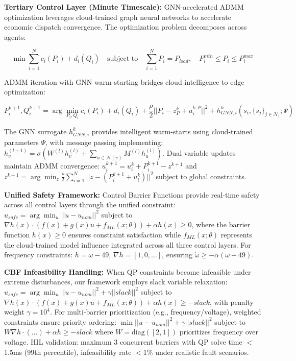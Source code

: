 \documentclass[12pt]{article}
\begin{document}
\textbf{Tertiary Control Layer (Minute Timescale):} GNN-accelerated ADMM optimization leverages cloud-trained graph neural networks to accelerate economic dispatch convergence. The optimization problem decomposes across agents:

$$\min \sum_{i=1}^N c_i(P_i) + d_i(Q_i) \quad \text{subject to} \quad \sum_{i=1}^N P_i = P_{load}, \quad P_i^{min} \leq P_i \leq P_i^{max}$$

ADMM iteration with GNN warm-starting bridges cloud intelligence to edge optimization:

$$P_i^{k+1}, Q_i^{k+1} = \arg\min_{P_i,Q_i} c_i(P_i) + d_i(Q_i) + \frac{\rho}{2}||P_i - z_P^k + u_i^{k,P}||^2 + h_{GNN,i}^k(s_i, \{s_j\}_{j \in \mathcal{N}_i}; \Psi)$$

The GNN surrogate $h_{GNN,i}^k$ provides intelligent warm-starts using cloud-trained parameters $\Psi$, with message passing implementing: $h_v^{(l+1)} = \sigma\left(W^{(l)} h_v^{(l)} + \sum_{u \in \mathcal{N}(v)} M^{(l)} h_u^{(l)}\right)$. Dual variable updates maintain ADMM convergence: $u_i^{k+1} = u_i^k + P_i^{k+1} - z^{k+1}$ and $z^{k+1} = \arg\min_z \frac{\rho}{2}\sum_{i=1}^N ||z - (P_i^{k+1} + u_i^k)||^2$ subject to global constraints.

\textbf{Unified Safety Framework:} Control Barrier Functions \cite{ames2017} provide real-time safety across all control layers through the unified constraint: $u_{safe} = \arg\min_u ||u - u_{nom}||^2$ subject to $\nabla h(x) \cdot (f(x) + g(x)u + f_{ML}(x; \theta)) + \alpha h(x) \geq 0$, where the barrier function $h(x) \geq 0$ ensures constraint satisfaction while $f_{ML}(x; \theta)$ represents the cloud-trained model influence integrated across all three control layers. For frequency constraints: $h = \omega - 49$, $\nabla h = [1,0,\ldots]$, ensuring $\dot{\omega} \geq -\alpha(\omega - 49)$.

\textbf{CBF Infeasibility Handling:} When QP constraints become infeasible under extreme disturbances, our framework employs slack variable relaxation: $u_{safe} = \arg\min_u ||u - u_{nom}||^2 + \gamma||slack||^2$ subject to $\nabla h(x) \cdot (f(x) + g(x)u + f_{ML}(x; \theta)) + \alpha h(x) \geq -slack$, with penalty weight $\gamma = 10^4$. For multi-barrier prioritization (e.g., frequency/voltage), weighted constraints ensure priority ordering: $\min ||u-u_{nom}||^2 + \gamma||slack||^2$ subject to $W\nabla h \cdot (\ldots) + \alpha h \geq -slack$ where $W = \text{diag}([2,1])$ prioritizes frequency over voltage. HIL validation: maximum 3 concurrent barriers with QP solve time $<$1.5ms (99th percentile), infeasibility rate $<$1\% under realistic fault scenarios.
\end{document}
